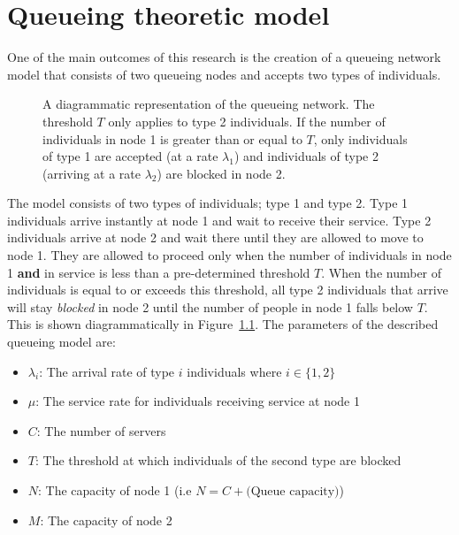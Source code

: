 \chapter{Queueing theoretic model}\label{sec:queueing_section}

One of the main outcomes of this research is the creation of a queueing network
model that consists of two queueing nodes and accepts two types of individuals.

\begin{figure}[H]
    \centering
    
    \caption{A diagrammatic representation of the queueing network.
    The threshold \(T\) only applies to type 2 individuals.
    If the number of individuals in node 1 is greater than or equal to
    \(T\), only individuals of type 1 are accepted (at a rate \(\lambda_1\))
    and individuals of type 2 (arriving at a rate \(\lambda_2\)) are blocked in
    node 2.}
    \label{fig:diagram_of_queueing_system}
\end{figure}

The model consists of two types of individuals; type 1 and type 2.
Type 1 individuals arrive instantly at node 1 and wait to receive their
service.
Type 2 individuals arrive at node 2 and wait there until they are
allowed to move to node 1.
They are allowed to proceed only when the number of
individuals in node 1 \textbf{and} in service is less than a
pre-determined threshold \(T\).
When the number of individuals is equal to or exceeds this threshold, all
type 2 individuals that arrive will stay \textit{blocked} in node 2
until the number of people in node 1 falls below \(T\).
This is shown diagrammatically in Figure~\ref{fig:diagram_of_queueing_system}.
The parameters of the described queueing model are:

\begin{itemize}
    \item \(\lambda_i\): The arrival rate of type \(i\) individuals where
    \(i\in\{1, 2\}\)
    \item \(\mu\): The service rate for individuals receiving service at
    node 1
    \item \(C\): The number of servers
    \item \(T\): The threshold at which individuals of the second type are
    blocked
    \item \(N\): The capacity of node 1 (i.e \(N=C + 
    \text{(Queue capacity)}\))
    \item \(M\): The capacity of node 2
\end{itemize}

